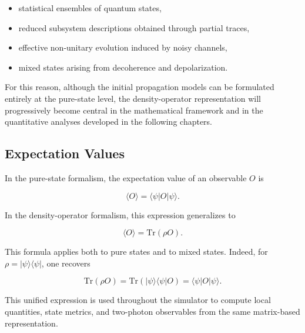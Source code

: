 \begin{itemize}
    \item statistical ensembles of quantum states,
    \item reduced subsystem descriptions obtained through partial traces,
    \item effective non-unitary evolution induced by noisy channels,
    \item mixed states arising from decoherence and depolarization.
\end{itemize}

\medskip

For this reason, although the initial propagation models can be formulated entirely at the pure-state level, the density-operator representation will progressively become central in the mathematical framework and in the quantitative analyses developed in the following chapters.


\subsection{Expectation Values}
\label{subsec:density_operator_expectation_values}

In the pure-state formalism, the expectation value of an observable \( O \) is

\[
\langle O \rangle
=
\langle \psi | O | \psi \rangle .
\]

In the density-operator formalism, this expression generalizes to

\begin{equation}
\langle O \rangle
=
\mathrm{Tr}(\rho O).
\label{eq:density_expectation_value}
\end{equation}

This formula applies both to pure states and to mixed states. Indeed, for
\( \rho = |\psi\rangle\langle\psi| \), one recovers

\[
\mathrm{Tr}(\rho O)
=
\mathrm{Tr}
\left(
|\psi\rangle\langle\psi| O
\right)
=
\langle \psi | O | \psi \rangle .
\]

\medskip

This unified expression is used throughout the simulator to compute local quantities, state metrics, and two-photon observables from the same matrix-based representation.


